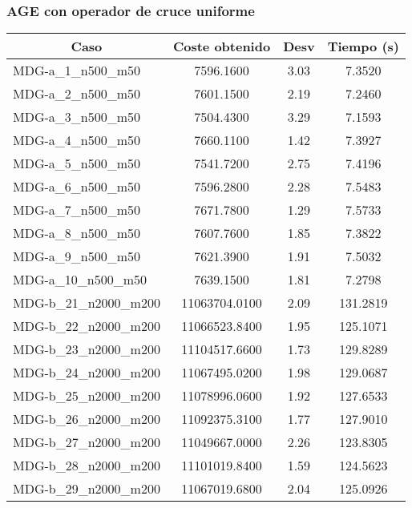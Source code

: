 \documentclass[10pt,a4paper]{article}
\begin{document}
\subsubsection{AGE con operador de cruce uniforme}
\begin{table}[H]
	\begin{center}
		\begin{tabular}{|l|c|c|c|} 
			\hline
			\multicolumn{1}{|c|}{\textbf{Caso}} & \textbf{Coste obtenido} & \textbf{Desv} & \textbf{Tiempo (s)} \\ \hline
			\hline
					MDG-a\_1\_n500\_m50 & 7596.1600 & 3.03 & 7.3520 \\ \hline
					MDG-a\_2\_n500\_m50 & 7601.1500 & 2.19 & 7.2460 \\ \hline
					MDG-a\_3\_n500\_m50 & 7504.4300 & 3.29 & 7.1593 \\ \hline
					MDG-a\_4\_n500\_m50 & 7660.1100 & 1.42 & 7.3927 \\ \hline
					MDG-a\_5\_n500\_m50 & 7541.7200 & 2.75 & 7.4196 \\ \hline
					MDG-a\_6\_n500\_m50 & 7596.2800 & 2.28 & 7.5483 \\ \hline
					MDG-a\_7\_n500\_m50 & 7671.7800 & 1.29 & 7.5733 \\ \hline
					MDG-a\_8\_n500\_m50 & 7607.7600 & 1.85 & 7.3822 \\ \hline
					MDG-a\_9\_n500\_m50 & 7621.3900 & 1.91 & 7.5032 \\ \hline
					MDG-a\_10\_n500\_m50 & 7639.1500 & 1.81 & 7.2798 \\ \hline
					MDG-b\_21\_n2000\_m200 & 11063704.0100 & 2.09 & 131.2819 \\ \hline
					MDG-b\_22\_n2000\_m200 & 11066523.8400 & 1.95 & 125.1071 \\ \hline
					MDG-b\_23\_n2000\_m200 & 11104517.6600 & 1.73 & 129.8289 \\ \hline
					MDG-b\_24\_n2000\_m200 & 11067495.0200 & 1.98 & 129.0687 \\ \hline
					MDG-b\_25\_n2000\_m200 & 11078996.0600 & 1.92 & 127.6533 \\ \hline
					MDG-b\_26\_n2000\_m200 & 11092375.3100 & 1.77 & 127.9010 \\ \hline
					MDG-b\_27\_n2000\_m200 & 11049667.0000 & 2.26 & 123.8305 \\ \hline
					MDG-b\_28\_n2000\_m200 & 11101019.8400 & 1.59 & 124.5623 \\ \hline
					MDG-b\_29\_n2000\_m200 & 11067019.6800 & 2.04 & 125.0926 \\ \hline

\end{tabular}
\end{center}
\end{table}
\end{document}
